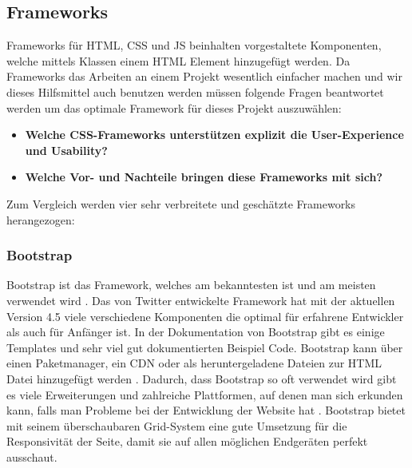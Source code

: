 	
	
	\subsection{Frameworks}
	Frameworks für HTML, CSS und JS beinhalten vorgestaltete Komponenten, welche mittels Klassen einem HTML Element hinzugefügt werden. Da Frameworks das Arbeiten an einem Projekt wesentlich einfacher machen und wir dieses Hilfsmittel auch benutzen werden müssen folgende Fragen beantwortet werden um das optimale Framework für dieses Projekt auszuwählen:
	\begin{itemize}
		\item \textbf{Welche CSS-Frameworks unterstützen explizit die User-Experience und Usability?}
		\item \textbf{Welche Vor- und Nachteile bringen diese Frameworks mit sich?}
	\end{itemize}
	Zum Vergleich werden vier sehr verbreitete und geschätzte Frameworks herangezogen:
		\subsubsection{Bootstrap}
		Bootstrap ist das Framework, welches am bekanntesten ist und am meisten verwendet wird \cite{introduction-bootstrap, learning-bootstrap}. Das von Twitter entwickelte Framework hat mit der aktuellen Version 4.5 viele verschiedene Komponenten die optimal für erfahrene Entwickler als auch für Anfänger ist. In der Dokumentation von Bootstrap gibt es einige Templates und sehr viel gut dokumentierten Beispiel Code\cite{introduction-bootstrap}. Bootstrap kann über einen Paketmanager, ein CDN oder als heruntergeladene Dateien zur HTML Datei hinzugefügt werden \cite{bootstrap-docu}. Dadurch, dass Bootstrap so oft verwendet wird gibt es viele Erweiterungen und zahlreiche Plattformen, auf denen man sich erkunden kann, falls man Probleme bei der Entwicklung der Website hat \cite{learning-bootstrap}. Bootstrap bietet mit seinem überschaubaren Grid-System eine gute Umsetzung für die Responsivität der Seite, damit sie auf allen möglichen Endgeräten perfekt ausschaut.
